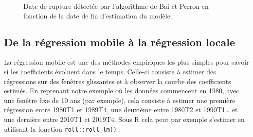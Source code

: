 \documentclass[
  a4paper,
  DIV=11,
  numbers=noendperiod,
  french]{scrartcl}
\newenvironment{Shaded}{\begin{snugshade}}{\end{snugshade}}
\newcommand{\AttributeTok}[1]{\textcolor[rgb]{0.40,0.45,0.13}{#1}}
\newcommand{\DecValTok}[1]{\textcolor[rgb]{0.68,0.00,0.00}{#1}}
\newcommand{\FunctionTok}[1]{\textcolor[rgb]{0.28,0.35,0.67}{#1}}
\newcommand{\NormalTok}[1]{\textcolor[rgb]{0.00,0.23,0.31}{#1}}
\newcommand{\OtherTok}[1]{\textcolor[rgb]{0.00,0.23,0.31}{#1}}
\newcommand{\SpecialCharTok}[1]{\textcolor[rgb]{0.37,0.37,0.37}{#1}}
\newcommand{\StringTok}[1]{\textcolor[rgb]{0.13,0.47,0.30}{#1}}
\newcommand\1{{\mathds 1}}
\theoremstyle{remark}
\begin{document}
\begin{figure}

\caption{\label{fig-temps-reel-bp}Date de rupture détectée par
l'algorithme de Bai et Perron en fonction de la date de fin d'estimation
du modèle.}


\end{figure}%

\subsection{De la régression mobile à la régression
locale}\label{sec-reg-locale}

La régression mobile est une des méthodes empiriques les plus simples
pour savoir si les coefficients évoluent dans le temps. Celle-ci
consiste à estimer des régressions sur des fenêtres glissantes et à
observer la courbe des coefficients estimés. En reprenant notre exemple
où les données commencent en 1980, avec une fenêtre fixe de 10 ans (par
exemple), cela consiste à estimer une première régression entre 1980T1
et 1989T4, une deuxième entre 1980T2 et 1990T1\ldots{} et une dernière
entre 2010T1 et 2019T4. Sous R cela peut par exemple s'estimer en
utilisant la fonction \texttt{roll::roll\_lm()} \autocite{roll} :

\begin{Shaded}
\end{Shaded}
\end{document}
